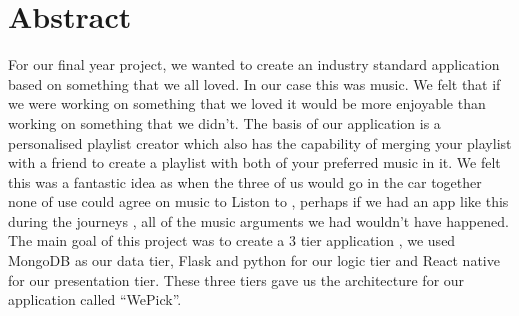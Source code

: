 
\chapter*{Abstract}
For our final year project, we wanted to create an industry standard application based on something that we all loved. In our case this was music. We felt that if we were working on something that we loved it would be more enjoyable than working on something that we didn’t. The basis of our application is a personalised playlist creator which also has the capability of merging your playlist with a friend to create a playlist with both of your preferred music in it. We felt this was a fantastic idea as when the three of us would go in the car together none of use could agree on music to Liston to ,  perhaps if we had an app like this during the journeys , all of the music arguments we had wouldn’t have happened. The main goal of this project was to create a 3 tier application , we used MongoDB as our data tier, Flask and python for our logic tier and React native for our presentation tier. These three tiers gave us the architecture for our application called “WePick”.


